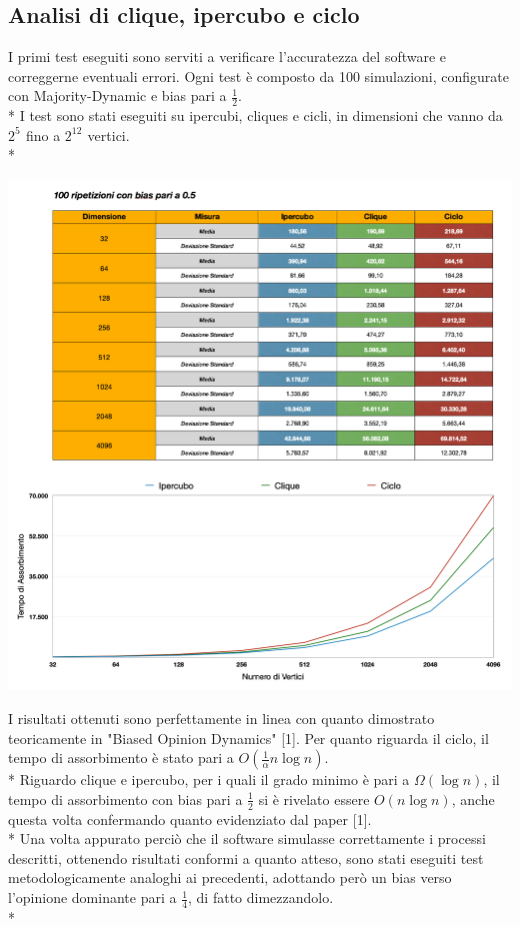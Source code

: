 \documentclass{article}
\begin{document}
\subsection{Analisi di clique, ipercubo e ciclo}
I primi test eseguiti sono serviti a verificare l'accuratezza del software e correggerne eventuali errori. Ogni test è composto da 100 simulazioni, configurate con Majority-Dynamic e bias pari a $\frac{1}{2}$.\\*
I test sono stati eseguiti su ipercubi, cliques e cicli, in dimensioni che vanno da $2^{5^{\mathrm{}}}$ fino a $2^{12^{\mathrm{}}}$ vertici.\\*
\begin{center}
\includegraphics[width=1\textwidth]{test_bias05.png}
\end{center}
I risultati ottenuti sono perfettamente in linea con quanto dimostrato teoricamente in  "Biased Opinion Dynamics" [1]. Per quanto riguarda il ciclo, il tempo di assorbimento è stato pari a $O(\frac{1}{\alpha}n\log{}n)$. \\*
Riguardo clique e ipercubo, per i quali il grado minimo è pari a $\Omega(\log{}n)$, il tempo di assorbimento con bias pari a $\frac{1}{2}$ si è rivelato essere $O(n\log{}n)$, anche questa volta confermando quanto evidenziato dal paper [1].\\*
Una volta appurato perciò che il software simulasse correttamente i processi descritti, ottenendo risultati conformi a quanto atteso, sono stati eseguiti test metodologicamente analoghi ai precedenti, adottando però un bias verso l'opinione dominante pari a $\frac{1}{4}$, di fatto dimezzandolo.\\*
\end{document}
